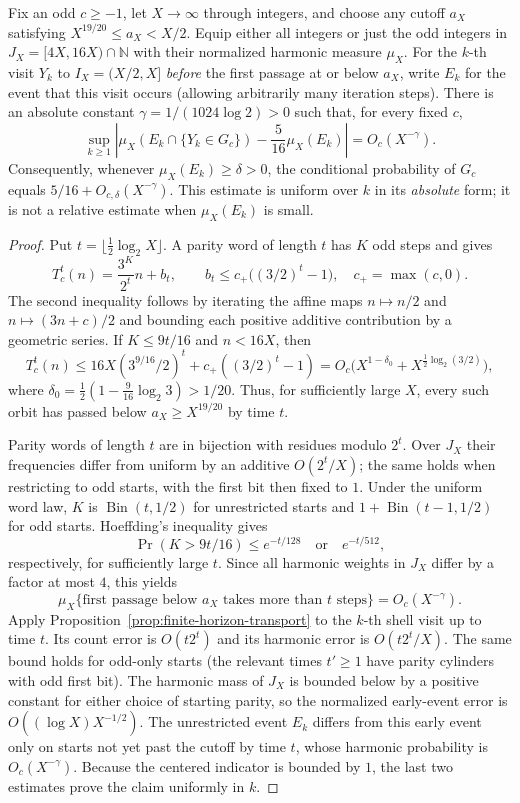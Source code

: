 \begin{proposition}
\label{prop:full-time-shallow-mod16}
Fix an odd $c\ge-1$, let $X\to\infty$ through integers, and
choose any cutoff $a_X$ satisfying
$X^{19/20}\le a_X<X/2$. Equip either all integers or just the
odd integers in $J_X=[4X,16X)\cap\mathbb N$ with their normalized
harmonic measure $\mu_X$. For the $k$-th visit $Y_k$ to
$I_X=(X/2,X]$ \emph{before} the first passage at or below $a_X$,
write $E_k$ for the event that this visit occurs (allowing arbitrarily
many iteration steps). There is an absolute constant
$\gamma=1/(1024\log 2)>0$ such that, for every fixed $c$,
\[
 \sup_{k\ge1}\left|
 \mu_X(E_k\cap\{Y_k\in G_c\})-\frac5{16}\mu_X(E_k)
 \right|=O_c(X^{-\gamma}).
\]
Consequently, whenever $\mu_X(E_k)\ge\delta>0$, the conditional
probability of $G_c$ equals $5/16+O_{c,\delta}(X^{-\gamma})$.
This estimate is uniform over $k$ in its \emph{absolute} form;
it is not a relative estimate when $\mu_X(E_k)$ is small.
\end{proposition}
\begin{proof}
Put $t=\lfloor\tfrac12\log_2 X\rfloor$. A parity word of
length $t$ has $K$ odd steps and gives
\[
 T_c^t(n)=\frac{3^K}{2^t}n+b_t,\qquad
 b_t\le c_+\bigl((3/2)^t-1\bigr),\quad c_+=\max(c,0).
\]
The second inequality follows by iterating the affine maps
$n\mapsto n/2$ and $n\mapsto(3n+c)/2$ and bounding each
positive additive contribution by a geometric series.
If $K\le9t/16$ and $n<16X$, then
\[
 T_c^t(n)\le16X(3^{9/16}/2)^t
     +c_+((3/2)^t-1)
    =O_c\bigl(X^{1-\delta_0}+X^{\frac12\log_2(3/2)}\bigr),
\]
where
$\delta_0=\frac12(1-\frac9{16}\log_2 3)>1/20$.
Thus, for sufficiently large $X$, every such orbit has passed
below $a_X\ge X^{19/20}$ by time $t$.

Parity words of length $t$ are in bijection with residues modulo
$2^t$. Over $J_X$ their frequencies differ from uniform by an
additive $O(2^t/X)$; the same holds when restricting to odd
starts, with the first bit then fixed to $1$. Under the uniform
word law, $K$ is $\operatorname{Bin}(t,1/2)$ for unrestricted
starts and $1+\operatorname{Bin}(t-1,1/2)$ for odd starts.
Hoeffding's inequality gives
\[
 \Pr(K>9t/16)\le e^{-t/128}
 \quad\text{or}\quad e^{-t/512},
\]
respectively, for sufficiently large $t$. Since all harmonic
weights in $J_X$ differ by a factor at most $4$, this yields
\[
 \mu_X\{\text{first passage below }a_X\text{ takes more
 than }t\text{ steps}\}
 =O_c(X^{-\gamma}).
\]
Apply Proposition~\ref{prop:finite-horizon-transport} to the
$k$-th shell visit up to time $t$. Its count error is
$O(t2^t)$ and its harmonic error is $O(t2^t/X)$.
The same bound holds for odd-only starts (the relevant times
$t'\ge1$ have parity cylinders with odd first bit).
The harmonic mass of $J_X$ is bounded below by a positive
constant for either choice of starting parity, so the normalized
early-event error is $O((\log X)X^{-1/2})$.
The unrestricted event $E_k$ differs from this early event
only on starts not yet past the cutoff by time $t$, whose
harmonic probability is $O_c(X^{-\gamma})$. Because the
centered indicator is bounded by $1$, the last two estimates
prove the claim uniformly in $k$.
\end{proof}



